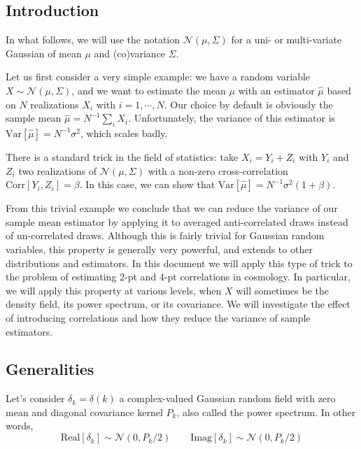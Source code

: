 \documentclass{aastex6}
\newcommand{\equ}[1]{\begin{equation}#1\end{equation}}
\begin{document}
\subsection{Introduction}

In what follows, we will use the notation $\mathcal{N}(\mu, \Sigma)$ for a uni- or multi-variate Gaussian of mean $\mu$ and (co)variance $\Sigma$.

Let us first consider a very simple example: we have a random variable $X \sim \mathcal{N}(\mu, \Sigma)$, and we want to estimate the mean $\mu$ with an estimator $\hat{\mu}$ based on $N$ realizations $X_i$ with $i=1, \cdots, N$. 
Our choice by default is obviously the sample mean $\hat{\mu} =  N^{-1} \sum_i X_i$.
Unfortunately, the variance of this estimator is $\mathrm{Var}[\hat{\mu}] = N^{-1}  \sigma^2 $, which scales badly. 

There is a standard trick in the field of statistics: take $X_i = Y_i + Z_i$ with  $Y_i$ and $Z_i$ two realizations of $\mathcal{N}(\mu, \Sigma)$ with a non-zero cross-correlation $\mathrm{Corr}[Y_i, Z_i] = \beta$.
In this case, we can show that  $\mathrm{Var}[\hat{\mu}] = N^{-1}  \sigma^2 (1+\beta) $. 

From this trivial example we conclude that we can reduce the variance of our sample mean estimator by applying it to averaged anti-correlated draws instead of un-correlated draws. 
Although this is fairly trivial for Gaussian random variables, this property is generally very powerful, and extends to other distributions and estimators.
In this document we will apply this type of trick to the problem of estimating 2-pt and 4-pt correlations in cosmology.
In particular, we will apply this property at various levels, when $X$ will sometimes be the density field, its power spectrum, or its covariance.
We will investigate the effect of introducing correlations and how they reduce the variance of sample estimators.

\subsection{Generalities}

Let's consider $\delta_k = \delta(k)$ a complex-valued Gaussian random field with zero mean and diagonal covariance kernel $P_{k}$, also called the power spectrum. In other words,
\equ{
	\mathrm{Real}[\delta_k] \sim \mathcal{N}(0, P_k/2) \quad \quad \mathrm{Imag}[\delta_k] \sim \mathcal{N}(0, P_k/2) \label{eq:p_delta}
}
\end{document}
